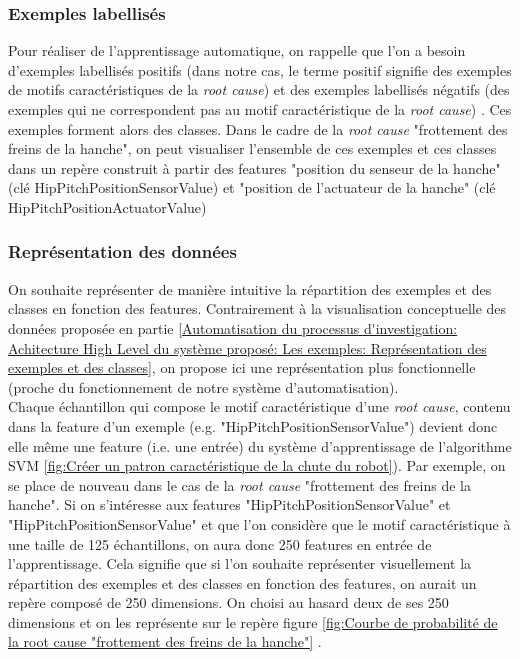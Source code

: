 \subsubsection{Exemples labellisés}
\label{Automatisation du processus d'investigation: Reconnaissance de motifs: Exemples labellisés}
Pour réaliser de l'apprentissage automatique, on rappelle que l'on a besoin d'exemples labellisés positifs (dans notre cas, le terme positif signifie des exemples de motifs caractéristiques de la \emph{root cause}) et des exemples labellisés négatifs (des exemples qui ne correspondent pas au motif caractéristique de la \emph{root cause}) . Ces exemples forment alors des classes. Dans le cadre de la \emph{root cause} "frottement des freins de la hanche", on peut visualiser l'ensemble de ces exemples et ces classes dans un repère construit à partir des features "position du senseur de la hanche" (clé HipPitchPositionSensorValue) et "position de l'actuateur de la hanche" (clé HipPitchPositionActuatorValue)

\subsubsection{Représentation des données}
\label{Automatisation du processus d'investigation: Reconnaissance de motifs: Représentation des données}
On souhaite représenter de manière intuitive la répartition des exemples et des classes en fonction des features. Contrairement à la visualisation conceptuelle des données proposée en partie \ref{Automatisation du processus d'investigation: Achitecture High Level du système proposé: Les exemples: Représentation des exemples et des classes}, on propose ici une représentation plus fonctionnelle (proche du fonctionnement de notre système d'automatisation). \\
Chaque échantillon qui compose le motif caractéristique d'une \emph{root cause}, contenu dans la feature d'un exemple (e.g. "HipPitchPositionSensorValue") devient donc elle même une feature (i.e. une entrée) du système d'apprentissage de l'algorithme SVM \ref{fig:Créer un patron caractéristique de la chute du robot}). Par exemple, on se place de nouveau dans le cas de la \emph{root cause} "frottement des freins de la hanche". Si on s'intéresse aux features "HipPitchPositionSensorValue" et "HipPitchPositionSensorValue" et que l'on considère que le motif caractéristique à une taille de 125 échantillons, on aura donc 250 features en entrée de l'apprentissage. Cela signifie que si l'on souhaite représenter visuellement la répartition des exemples et des classes en fonction des features, on aurait un repère composé de 250 dimensions. On choisi au hasard deux de ses 250 dimensions et on les représente sur le repère figure 	\ref{fig:Courbe de probabilité de la root cause "frottement des freins de la hanche"} .


